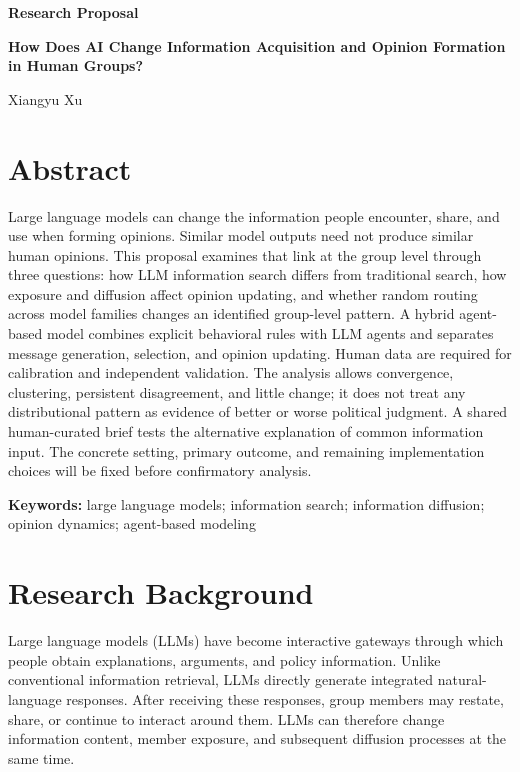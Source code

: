 \documentclass[11pt,a4paper]{article}
\begin{document}
\begin{titlepage}
\centering
\vspace*{2.5cm}
{\sffamily\bfseries\color{navy}\LARGE Research Proposal\par}
\vspace{1.2cm}
{\sffamily\bfseries\Huge How Does AI Change Information Acquisition and Opinion Formation in Human Groups?\par}
\vspace{1.5cm}
{\sffamily\Large Xiangyu Xu\par}
\vspace{0.8cm}

\vfill
\end{titlepage}

\section*{Abstract}

Large language models can change the information people encounter, share, and use when forming opinions. Similar model outputs need not produce similar human opinions. This proposal examines that link at the group level through three questions: how LLM information search differs from traditional search, how exposure and diffusion affect opinion updating, and whether random routing across model families changes an identified group-level pattern. A hybrid agent-based model combines explicit behavioral rules with LLM agents and separates message generation, selection, and opinion updating. Human data are required for calibration and independent validation. The analysis allows convergence, clustering, persistent disagreement, and little change; it does not treat any distributional pattern as evidence of better or worse political judgment. A shared human-curated brief tests the alternative explanation of common information input. The concrete setting, primary outcome, and remaining implementation choices will be fixed before confirmatory analysis.

\textbf{Keywords:} large language models; information search; information diffusion; opinion dynamics; agent-based modeling

\section{Research Background}

Large language models (LLMs) have become interactive gateways through which people obtain explanations, arguments, and policy information. Unlike conventional information retrieval, LLMs directly generate integrated natural-language responses. After receiving these responses, group members may restate, share, or continue to interact around them. LLMs can therefore change information content, member exposure, and subsequent diffusion processes at the same time.
\end{document}
